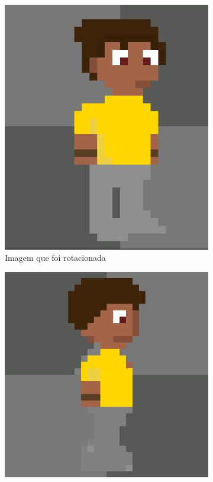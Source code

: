 \begin{figure}[htbp]
    \centering
    \caption{\small Processo da utilização 9 da ferramenta de rotação do PixelLab em julho/2025}
    \label{fig:pixelLabRotacao10}

    \begin{subfigure}{0.24\linewidth}
        \includegraphics[width=0.83\linewidth]{figs/pixelLab/dia2/fix_teste_3.PNG}
        \caption{\small Imagem que foi rotacionada}
        \label{fig:pixelLabRotacao10a}
    \end{subfigure}
    \begin{subfigure}{0.24\linewidth}
        \includegraphics[width=1\linewidth]{figs/pixelLab/dia2/init.PNG}

\end{subfigure}
\end{figure}
